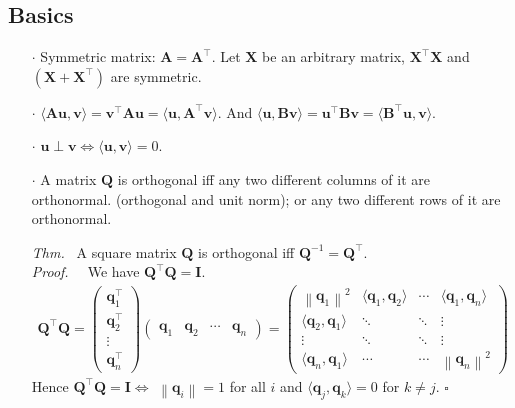 \documentclass[a4paper, 11pt]{article}
\begin{document}
\subsection{Basics}
\begin{itemize}
	\item[$\cdot$] Symmetric matrix: $\bm{A} = \bm{A}^{\top}$. Let $\bm{X}$ be an arbitrary matrix, $\bm{X}^{\top} \bm{X}$ and $(\bm{X}+\bm{X}^{\top})$ are symmetric.

	\item[$\cdot$] $\langle \bm{Au}, \bm{v} \rangle = \bm{v}^{\top}\bm{Au} = \langle \bm{u}, \bm{A}^{\top}\bm{v} \rangle$. And $\langle \bm{u}, \bm{Bv} \rangle = \bm{u}^{\top}\bm{Bv}=\langle \bm{B}^{\top}\bm{u}, \bm{v} \rangle$. 

	\item[$\cdot$] $\bm{u} \perp \bm{v} \iff \langle \bm{u}, \bm{v} \rangle = 0$.

	\item[$\cdot$] A matrix $\bm{Q}$ is orthogonal iff any two different columns of it are orthonormal. (orthogonal and unit norm); or any two different rows of it are orthonormal.

	\item[\textit{Thm.~}] A square matrix $\bm{Q}$ is orthogonal iff $\bm{Q}^{-1} = \bm{Q}^{\top}$.\\
	\textit{Proof.~~} We have $\bm{Q}^{\top} \bm{Q}=\bm{I}$.
	\begin{equation*}
		\begin{split}
			\bm{Q}^{\top} \bm{Q} = \begin{pmatrix}
				\bm{q}_1^{\top} \\
				\bm{q}_2^{\top} \\
				\vdots\\
				\bm{q}_n^{\top}
			\end{pmatrix}
			\begin{pmatrix}
				\bm{q}_1 & \bm{q}_2 & \cdots & \bm{q}_n
			\end{pmatrix} = 
			\begin{pmatrix}
				\left\|\bm{q}_1\right\|^2 & \langle \bm{q}_1, \bm{q}_2 \rangle & \cdots & \langle \bm{q}_1, \bm{q}_n \rangle\\
				\langle \bm{q}_2, \bm{q}_1 \rangle & \ddots & \ddots & \vdots\\
				\vdots & \ddots & \ddots & \vdots\\
				\langle \bm{q}_n, \bm{q}_1 \rangle & \cdots & \cdots & \left\|\bm{q}_n\right\|^2
			\end{pmatrix}
		\end{split}
	\end{equation*}
	Hence $\bm{Q}^{\top} \bm{Q}=\bm{I} \iff$ $\left\|\bm{q}_i\right\|=1$ for all $i$ and $\langle \bm{q}_j, \bm{q}_k \rangle=0$ for $k\ne j$. $\square$
\end{itemize}
\end{document}
